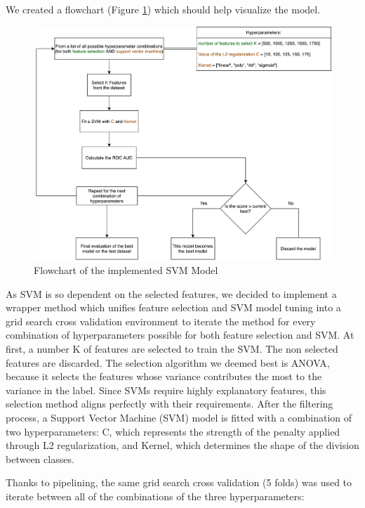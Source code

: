 \documentclass{article}
\begin{document}
We created a flowchart (Figure \ref{fig:Flowchart of the implemented SVM Model}) which should help visualize the model.

\begin{figure}[h]
	\centering
	\includegraphics[width=1.0\textwidth]{FlowChart.png}
	 \vspace{0em}
	\caption{Flowchart of the implemented SVM Model}
    \label{fig:Flowchart of the implemented SVM Model}
    
\end{figure}

As SVM is so dependent on the selected features, we decided to implement a wrapper method which unifies feature selection and SVM model tuning into a grid search cross validation environment to iterate the method for every combination of hyperparameters possible for both feature selection and SVM. At first, a number K of features are selected to train the SVM. The non selected features are discarded. The selection algorithm we deemed best is ANOVA, because it selects the features whose variance contributes the most to the variance in the label. Since SVMs require highly explanatory features, this selection method aligns perfectly with their requirements. After the filtering process, a Support Vector Machine (SVM) model is fitted with a combination of two hyperparameters: C, which represents the strength of the penalty applied through L2 regularization, and Kernel, which determines the shape of the division between classes.

Thanks to pipelining, the same grid search cross validation (5 folds) was used to iterate between all of the combinations of the three hyperparameters:
 
\end{document}
